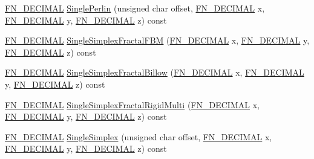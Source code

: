 \begin{DoxyCompactItemize}
\item 
\mbox{\hyperlink{_fast_noise_8h_a75a9ef6d2541c4921815b885bfd449c3}{F\+N\+\_\+\+D\+E\+C\+I\+M\+AL}} \mbox{\hyperlink{class_fast_noise_a93f68e6b4d364be7359076d5c7f19313}{Single\+Perlin}} (unsigned char offset, \mbox{\hyperlink{_fast_noise_8h_a75a9ef6d2541c4921815b885bfd449c3}{F\+N\+\_\+\+D\+E\+C\+I\+M\+AL}} x, \mbox{\hyperlink{_fast_noise_8h_a75a9ef6d2541c4921815b885bfd449c3}{F\+N\+\_\+\+D\+E\+C\+I\+M\+AL}} y, \mbox{\hyperlink{_fast_noise_8h_a75a9ef6d2541c4921815b885bfd449c3}{F\+N\+\_\+\+D\+E\+C\+I\+M\+AL}} z) const
\item 
\mbox{\hyperlink{_fast_noise_8h_a75a9ef6d2541c4921815b885bfd449c3}{F\+N\+\_\+\+D\+E\+C\+I\+M\+AL}} \mbox{\hyperlink{class_fast_noise_a2ac44ef2c9843f3024a3f0be9a47526b}{Single\+Simplex\+Fractal\+F\+BM}} (\mbox{\hyperlink{_fast_noise_8h_a75a9ef6d2541c4921815b885bfd449c3}{F\+N\+\_\+\+D\+E\+C\+I\+M\+AL}} x, \mbox{\hyperlink{_fast_noise_8h_a75a9ef6d2541c4921815b885bfd449c3}{F\+N\+\_\+\+D\+E\+C\+I\+M\+AL}} y, \mbox{\hyperlink{_fast_noise_8h_a75a9ef6d2541c4921815b885bfd449c3}{F\+N\+\_\+\+D\+E\+C\+I\+M\+AL}} z) const
\item 
\mbox{\hyperlink{_fast_noise_8h_a75a9ef6d2541c4921815b885bfd449c3}{F\+N\+\_\+\+D\+E\+C\+I\+M\+AL}} \mbox{\hyperlink{class_fast_noise_a6dd57ba17192a085544452db30caaf64}{Single\+Simplex\+Fractal\+Billow}} (\mbox{\hyperlink{_fast_noise_8h_a75a9ef6d2541c4921815b885bfd449c3}{F\+N\+\_\+\+D\+E\+C\+I\+M\+AL}} x, \mbox{\hyperlink{_fast_noise_8h_a75a9ef6d2541c4921815b885bfd449c3}{F\+N\+\_\+\+D\+E\+C\+I\+M\+AL}} y, \mbox{\hyperlink{_fast_noise_8h_a75a9ef6d2541c4921815b885bfd449c3}{F\+N\+\_\+\+D\+E\+C\+I\+M\+AL}} z) const
\item 
\mbox{\hyperlink{_fast_noise_8h_a75a9ef6d2541c4921815b885bfd449c3}{F\+N\+\_\+\+D\+E\+C\+I\+M\+AL}} \mbox{\hyperlink{class_fast_noise_a6a1e4725751d679b33705fa5867f7525}{Single\+Simplex\+Fractal\+Rigid\+Multi}} (\mbox{\hyperlink{_fast_noise_8h_a75a9ef6d2541c4921815b885bfd449c3}{F\+N\+\_\+\+D\+E\+C\+I\+M\+AL}} x, \mbox{\hyperlink{_fast_noise_8h_a75a9ef6d2541c4921815b885bfd449c3}{F\+N\+\_\+\+D\+E\+C\+I\+M\+AL}} y, \mbox{\hyperlink{_fast_noise_8h_a75a9ef6d2541c4921815b885bfd449c3}{F\+N\+\_\+\+D\+E\+C\+I\+M\+AL}} z) const
\item 
\mbox{\hyperlink{_fast_noise_8h_a75a9ef6d2541c4921815b885bfd449c3}{F\+N\+\_\+\+D\+E\+C\+I\+M\+AL}} \mbox{\hyperlink{class_fast_noise_a5e40c643992d4099dbe7f0a5be6460e7}{Single\+Simplex}} (unsigned char offset, \mbox{\hyperlink{_fast_noise_8h_a75a9ef6d2541c4921815b885bfd449c3}{F\+N\+\_\+\+D\+E\+C\+I\+M\+AL}} x, \mbox{\hyperlink{_fast_noise_8h_a75a9ef6d2541c4921815b885bfd449c3}{F\+N\+\_\+\+D\+E\+C\+I\+M\+AL}} y, \mbox{\hyperlink{_fast_noise_8h_a75a9ef6d2541c4921815b885bfd449c3}{F\+N\+\_\+\+D\+E\+C\+I\+M\+AL}} z) const

\end{DoxyCompactItemize}

